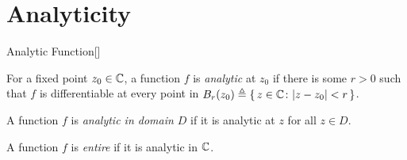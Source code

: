\documentclass[../complex_variables_1.tex]{subfiles}
\begin{document}
\section{Analyticity}

\begin{Definition}{Analytic Function}[]
\begin{itemize}
    \ii
    For a fixed point \(z_0 \in \CC\),
    a function \(f\) is \emph{analytic} at \(z_0\)
    if there is some \(r > 0\) such that
    \(f\) is differentiable at every point in
    \(B_r(z_0) \triangleq \{\,z \in \CC \colon |z - z_0| < r\,\}\).

    \ii
    A function \(f\) is \emph{analytic in domain \(D\)}
    if it is analytic at \(z\) for all \(z \in D\).

    \ii
    A function \(f\) is \emph{entire} if it is analytic in \(\CC\).
\end{itemize}
\end{Definition}
\end{document}

